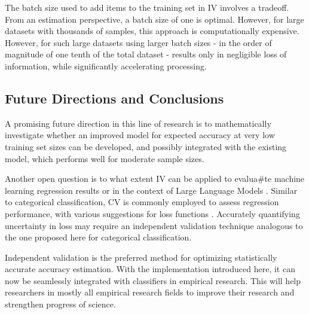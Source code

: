 \documentclass[article]{jss}
\begin{document}
The batch size used to add items to the training set in IV involves a tradeoff. From an estimation perspective, a batch size of one is optimal. However, for large datasets with thousands of samples, this approach is computationally expensive. However, for such large datasets using larger batch sizes - in the order of magnitude of one tenth of the total dataset - results only in negligible loss of information, while significantly accelerating processing.

\subsection{Future Directions and Conclusions} \label{sec:future_conclusions}
A promising future direction in this line of research is to mathematically investigate whether an improved model for expected accuracy at very low training set sizes can be developed, and possibly integrated with the existing model, which performs well for moderate sample sizes.

Another open question is to what extent IV can be applied to evalua#te machine learning regression results or in the context of Large Language Models \citep{touvron_llama:_2023}. Similar to categorical classification, CV is commonly employed to assess regression performance, with various suggestions for loss functions \citep{picard_cross-validation_1984}. Accurately quantifying uncertainty in loss may require an independent validation technique analogous to the one proposed here for categorical classification.

Independent validation is the preferred method for optimizing statistically accurate accuracy estimation. With the  implementation introduced here, it can now be seamlessly integrated with classifiers in empirical research. This will help researchers in mostly all empirical research fields to improve their research and strengthen progress of science.


\end{document}
